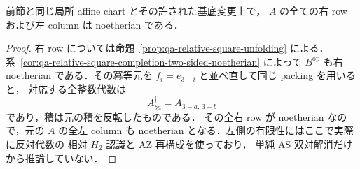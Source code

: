\begin{corollary}[展開後の左右Noether性]
\label{cor:qa-relative-square-unfolding-two-sided-noetherian}
前節と同じ局所 affine chart とその許された基底変更上で，
$A$ の全ての右 row および左 column は noetherian である．
\end{corollary}
\begin{proof}
右 row については命題~\ref{prop:qa-relative-square-unfolding} による．
系~\ref{cor:qa-relative-square-completion-two-sided-noetherian} によって
$B^{\mathrm{op}}$ も右 noetherian である．その冪等元を
$f_i=e_{3-i}$ と並べ直して同じ packing を用いると，
対応する全整数代数は
\[
 A^{\dagger}_{ba}=A_{3-a,\,3-b}
\]
であり，積は元の積を反転したものである．
その全右 row が noetherian なので，元の $A$ の全左 column も
noetherian となる．左側の有限性にはここで実際に反対代数の
相対 $H_2$ 認識と AZ 再構成を使っており，
単純 AS 双対解消だけから推論していない．
\end{proof}
